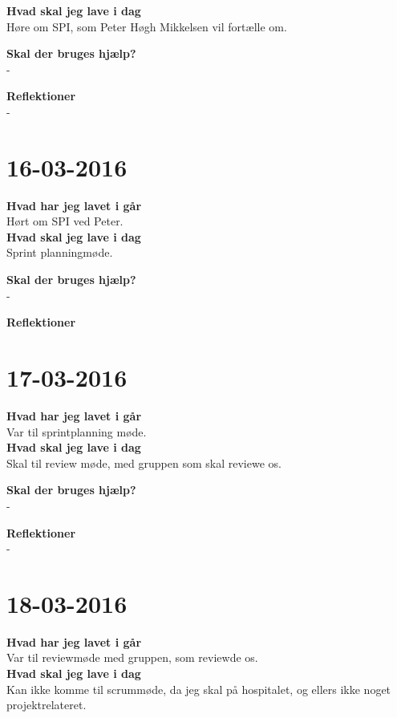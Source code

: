 \documentclass{article}
\begin{document}
	\textbf{Hvad skal jeg lave i dag}\\
	Høre om SPI, som Peter Høgh Mikkelsen vil fortælle om.     
	
	\textbf{Skal der bruges hjælp?}\\
	-
	
	\textbf{Reflektioner}\\
	-
	
	\section{16-03-2016}
	
	\textbf{Hvad har jeg lavet i går}\\
	Hørt om SPI ved Peter.\\
	
	\textbf{Hvad skal jeg lave i dag}\\
	Sprint planningmøde.    
	
	\textbf{Skal der bruges hjælp?}\\
	-
	
	\textbf{Reflektioner}\\
	
	
	\section{17-03-2016}
	
	\textbf{Hvad har jeg lavet i går}\\
	Var til sprintplanning møde.\\
	
	\textbf{Hvad skal jeg lave i dag}\\
	Skal til review møde, med gruppen som skal reviewe os.    
	
	\textbf{Skal der bruges hjælp?}\\
	-
	
	\textbf{Reflektioner}\\
	-
	
	\section{18-03-2016}
	
	\textbf{Hvad har jeg lavet i går}\\
	Var til reviewmøde med gruppen, som reviewde os.\\
	
	\textbf{Hvad skal jeg lave i dag}\\
	Kan ikke komme til scrummøde, da jeg skal på hospitalet, og ellers ikke noget projektrelateret.    
	
\end{document}
